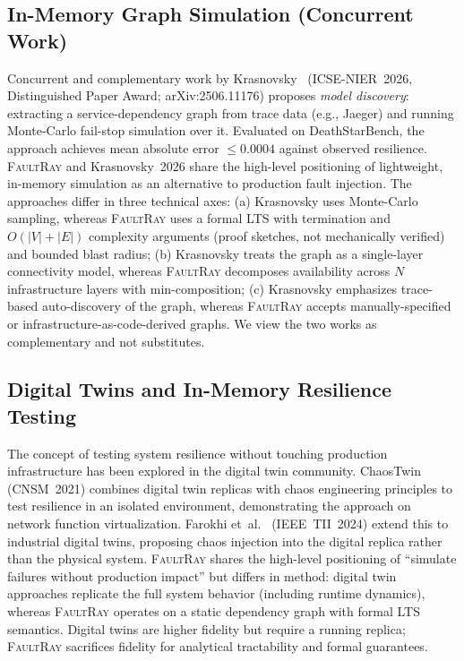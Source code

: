 \documentclass[10pt,twocolumn]{article}
\begin{document}
\subsection{In-Memory Graph Simulation (Concurrent Work)}
\label{sec:rw-krasnovsky}
Concurrent and complementary work by
Krasnovsky~\cite{krasnovsky2026} (ICSE-NIER~2026, Distinguished Paper Award; arXiv:2506.11176)
proposes \emph{model discovery}: extracting a service-dependency
graph from trace data (e.g., Jaeger) and running Monte-Carlo
fail-stop simulation over it. Evaluated on DeathStarBench, the
approach achieves mean absolute error $\leq 0.0004$ against
observed resilience.
\textsc{FaultRay} and Krasnovsky~2026 share the high-level positioning
of lightweight, in-memory simulation as an alternative to production
fault injection. The approaches differ in three technical axes:
(a) Krasnovsky uses Monte-Carlo sampling, whereas \textsc{FaultRay}
uses a formal LTS with termination and $O(|V|+|E|)$ complexity
arguments (proof sketches, not mechanically verified) and bounded
blast radius;
(b) Krasnovsky treats the graph as a single-layer connectivity
model, whereas \textsc{FaultRay} decomposes availability across $N$
infrastructure layers with min-composition;
(c) Krasnovsky emphasizes trace-based auto-discovery of the graph,
whereas \textsc{FaultRay} accepts manually-specified or
infrastructure-as-code-derived graphs.
We view the two works as complementary and not substitutes.

\subsection{Digital Twins and In-Memory Resilience Testing}
\label{sec:rw-digital-twin}
The concept of testing system resilience without touching
production infrastructure has been explored in the digital twin
community. ChaosTwin~\cite{chaostwin2021} (CNSM~2021) combines
digital twin replicas with chaos engineering principles to test
resilience in an isolated environment, demonstrating the approach
on network function virtualization. Farokhi
et~al.~\cite{farokhi2024} (IEEE~TII~2024) extend this to
industrial digital twins, proposing chaos injection into the
digital replica rather than the physical system.
\textsc{FaultRay} shares the high-level positioning of
``simulate failures without production impact'' but differs in
method: digital twin approaches replicate the full system
behavior (including runtime dynamics), whereas \textsc{FaultRay}
operates on a static dependency graph with formal LTS semantics.
Digital twins are higher fidelity but require a running replica;
\textsc{FaultRay} sacrifices fidelity for analytical tractability
and formal guarantees.
\end{document}
